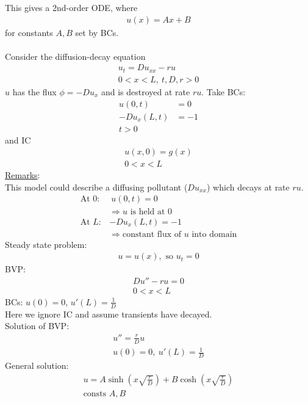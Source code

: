 \documentclass[12pt, letterpaper]{article}
\begin{document}
This gives a 2nd-order ODE, where 
\begin{align*}
    u(x) = Ax + B
\end{align*}
for constants $A,B$ set by BCs. \\ \\
 Consider the diffusion-decay equation
\begin{align*}
    u_t = Du_{xx} - ru \\
    0 < x < L,\ t,D,r > 0
\end{align*}
$u$ has the flux $\phi = - Du_x$ and is destroyed at rate $ru$. Take BCs: 
\begin{align*}
    u(0,t) &= 0 \\ 
    -Du_x(L,t) &= -1 \\
    t > 0
\end{align*}
and IC
\begin{align*}
    u(x,0) = g(x) \\
    0 < x < L
\end{align*}
\underline{Remarks}: \\
This model could describe a diffusing pollutant ($Du_{xx}$) which decays at rate $ru$.
\begin{align*}
    \text{At }0:&\ u(0,t) = 0 \\
    &\Rightarrow u\text{ is held at 0} \\
    \text{At }L:& -Du_x(L,t) = -1 \\
    &\Rightarrow \text{constant flux of }u \text{ into domain}
\end{align*}
Steady state problem:
\begin{align*}
    u = u(x), \text{ so } u_t = 0
\end{align*}
BVP:
\begin{align*}
    Du'' - ru = 0 \\ 0 < x < L
\end{align*}
BCs: $u(0) = 0$, $u'(L) = \frac{1}{D}$ \\
Here we ignore IC and assume transients have decayed. \\
Solution of BVP:
\begin{align*}
    u'' = \frac rD u \\
    u(0) = 0,\ u'(L) = \frac 1D
\end{align*}
General solution:
\begin{align*}
    u = A\sinh\left(x\sqrt{\frac{r}{D}}\right) + B\cosh\left(x\sqrt{\frac{r}{D}}\right) \\
    \text{consts } A,B
\end{align*}
\end{document}
